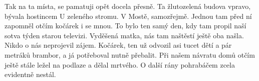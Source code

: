 
Tak na ta místa, se pamatuji opět docela přesně. Ta žlutozelená budova
vpravo, bývala hostincem U zeleného stromu. V Mostě, samozřejmě.
Jednou tam před ní zapomněl otčím kočárek i se mnou. To bylo ten samý
den, kdy tam propil naší sotva týden starou televizi. Vyděšená matka,
nás tam naštěstí ještě oba našla. Nikdo o nás neprojevil zájem.
Kočárek, ten už odvozil asi tucet dětí a pár metráků brambor, a já
potřeboval nutně přebalit. Při našem návratu domů otčím ještě stále
ležel na podlaze a dělal mrtvého. O další rány pohrabáčem zcela
evidentně nestál.
